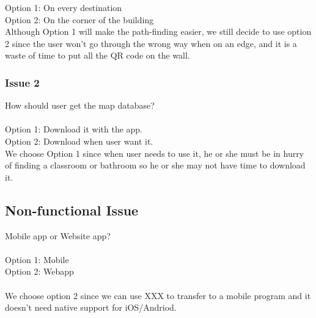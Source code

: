 \documentclass[12pt]{article}
\begin{document}
Option 1: On every destination \\
Option 2: On the corner of the building \\

Although Option 1 will make the path-finding easier, we still decide to use option 2 since the user won’t go through the wrong way when on an edge, and it is a waste of time to put all the QR code on the wall.

\subsubsection{Issue 2}
How should user get the map database? \\ \\

Option 1: Download it with the app. \\
Option 2: Download when user want it. \\

We choose Option 1 since when user needs to use it, he or she must be in hurry of finding a classroom or bathroom so he or she may not have time to download it. 



\subsection{Non-functional Issue}
Mobile app or Website app? \\ \\
Option 1: Mobile \\
Option 2: Webapp \\ \\

We choose option 2 since we can use XXX to transfer to a mobile program and it doesn't need native support for iOS/Andriod.
\end{document}
